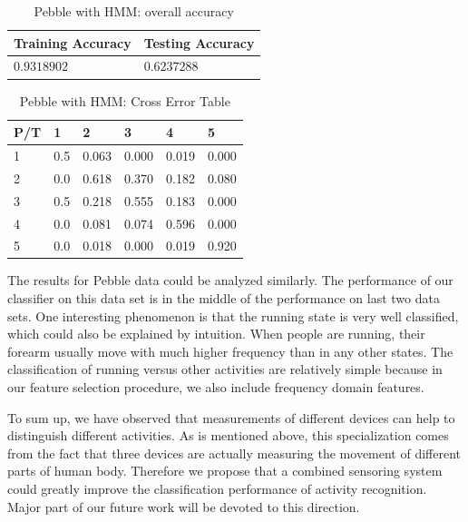 \begin{itemize}
\begin{table}[H]
\begin{center}
\begin{tabular}{|l|l|}
      \hline
      Training Accuracy & Testing Accuracy\\
      \hline
      $0.9318902$ & $ 0.6237288$ \\
      \hline
\end{tabular}
\caption{Pebble with HMM: overall accuracy}
\label{tab:pebbleHMM1}
\end{center}
\end{table}
\begin{table}[H]
\begin{center}
\begin{tabular}{|l|l|l|l|l|l|}
      \hline
      P/T& 1 & 2 &3 & 4 & 5 \\
      \hline
      1 &0.5&0.063&0.000&0.019&0.000\\
      2 &0.0&0.618&0.370&0.182&0.080\\
      3 &0.5&0.218&0.555&0.183&0.000\\
      4 &0.0&0.081&0.074&0.596&0.000\\
      5 &0.0&0.018&0.000&0.019&0.920\\
      \hline
\end{tabular}
\caption{Pebble with HMM: Cross Error Table}
\label{tab:pebbleHMM2}
\end{center}
\end{table}
\end{itemize}

The results for Pebble data could be analyzed similarly. The performance of our classifier on this data set is in the middle of the performance on last two data sets. One interesting phenomenon is that the running state is very well classified, which could also be explained by intuition. When people are running, their forearm usually move with much higher frequency than in any other states. The classification of running versus other activities are relatively simple because in our feature selection procedure, we also include frequency domain features. 

To sum up, we have observed that measurements of different devices can help to distinguish different activities. As is mentioned above, this specialization comes from the fact that three devices are actually measuring the movement of different parts of human body. Therefore we propose that a combined sensoring system could greatly improve the classification performance of activity recognition. Major part of our future work will be devoted to this direction. 

